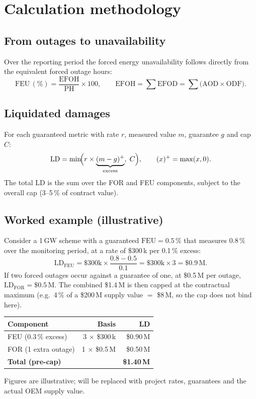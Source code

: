 \section{Calculation methodology}

\subsection{From outages to unavailability}
Over the reporting period the forced energy unavailability follows directly from
the equivalent forced outage hours:
\[
  \mathrm{FEU}\,(\%) = \frac{\mathrm{EFOH}}{\mathrm{PH}}\times 100,
  \qquad
  \mathrm{EFOH} = \sum \mathrm{EFOD} = \sum \bigl(\mathrm{AOD}\times\mathrm{ODF}\bigr).
\]

\subsection{Liquidated damages}
For each guaranteed metric with rate $r$, measured value $m$, guarantee $g$ and
cap $C$:
\[
  \mathrm{LD} = \min\!\Bigl( r \times \underbrace{(m-g)^+}_{\text{excess}},\; C \Bigr),
  \qquad (x)^+ = \max(x,0).
\]
The total LD is the sum over the FOR and FEU components, subject to the overall
cap (3--5\,\% of contract value).

\subsection{Worked example (illustrative)}
Consider a 1\,GW scheme with a guaranteed $\mathrm{FEU}=0.5\,\%$ that measures
$0.8\,\%$ over the monitoring period, at a rate of \$300\,k per 0.1\,\% excess:
\[
  \mathrm{LD}_{\mathrm{FEU}} = \$300\text{k} \times \frac{0.8-0.5}{0.1}
  = \$300\text{k}\times 3 = \$0.9\,\text{M}.
\]
If two forced outages occur against a guarantee of one, at \$0.5\,M per outage,
$\mathrm{LD}_{\mathrm{FOR}} = \$0.5\,\text{M}$. The combined \$1.4\,M is then
capped at the contractual maximum (e.g.\ 4\,\% of a \$200\,M supply value $=$
\$8\,M, so the cap does not bind here).

\begin{center}
\renewcommand{\arraystretch}{1.3}
\begin{tabular}{@{}l r r@{}}
  \toprule
  \textbf{Component} & \textbf{Basis} & \textbf{LD} \\
  \midrule
  FEU (0.3\,\% excess) & 3 $\times$ \$300\,k & \$0.90\,M \\
  FOR (1 extra outage) & 1 $\times$ \$0.5\,M & \$0.50\,M \\
  \midrule
  \textbf{Total (pre-cap)} & & \textbf{\$1.40\,M} \\
  \bottomrule
\end{tabular}
\end{center}

{\color{atGray}\footnotesize Figures are illustrative; will be replaced with project
rates, guarantees and the actual OEM supply value.}
